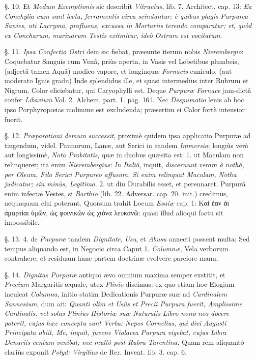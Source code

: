 \documentclass[a4paper, 11pt, oneside, polutonikogreek, german]{article}
\begin{document}
§. 10. Et \emph{Modum Exemptionis} sic describit \emph{Vitruvius}, lib. 7. Architect. cap. 13: \emph{Ea Conchylia cum sunt lecta, ferramentis circa scinduntur: è quibus plagis Purpurea Sanies, uti Lacryma, profluens, excussa in Mortariis terendo comparatur; et, quòd ex Concharum, marinarum Testis exitmitur, ideò Ostrum est vocitatum}.

§. 11. \emph{Ipsa Confectio Ostri} dein sic fiebat, præeunte iterum nobis \emph{Nierembergio}: Coquebatur Sanguis cum Venâ, priùs aperta, in Vasis vel Lebetibus plumbeis, (adjectâ tamen Aquâ) modico vapore, et longinquæ \emph{Fornacis} cuniculo, (aut moderato Ignis gradu) Inde splendidus ille, et quasi intermedius inter Rubrum et Nigrum, Color eliciebatur, qui Caryophylli est. Deque \emph{Purpuræ Fornace} jam-dictâ confer \emph{Libavium} Vol. 2. Alchem. part. 1. pag. 161. Nec \emph{Despumatio} lenis ab hoc ipso Porphyropœias molimine est excludenda; præsertim si Calor fortè intensior fuerit.

§. 12. \emph{Præparationi demum successit}, proximè quidem ipsa applicatio Purpuræ ad tingendum, videl. Pannorum, Lanæ, aut Serici in eandem \emph{Immersio}; longiùs verò aut longissimè, \emph{Nota Probitatis}, quæ in duobus quæsita est: 1. ut Maculam non relinqueret; ita enim \emph{Nierembergius}: \emph{In Italiâ}, inquit, \emph{discernunt veram à nothâ, per Oleum, Filo Serici Purpureo affusum. Si enim relinquat Maculam, Notha judicatur; sin minùs, Legitima}. 2. ut diu Durabilis esset, et perennaret. Purpurâ enim infectæ Vestes, si \emph{Barthio} (lib. 22. Adversar. cap. 20. init.) credimus, nequaquam elui poterant. Quorsum trahit Locum \emph{Esaiæ} cap. 1: Καὶ ἐαν ἁι ἀμαρτίαι ὑμῶν, ὡς φοινικῶν ὡς χιόνα λευκανῶ: quasi illud alioqui factu sit impossibile.

§. 13. 4. de \emph{Purpuræ} tandem \emph{Dignitate}, \emph{Usu}, et \emph{Abusu} annecti possent multa: Sed tempus aliquando est, in Negocio circa Caput 1. \emph{Columnæ}, Vela verborum contrahere, et residuam hanc partem doctrinæ evolvere parciore manu.

§. 14. \emph{Dignitas Purpuræ} antiquo ævo omnium maxima semper exstitit, et \emph{Precium} Margaritis æquale, utex \emph{Plinio} discimus: ex quo etiam hoc Elogium inculcat \emph{Columna}, initio statim Dedicationis Purpuræ suæ ad \emph{Cardinalem Sannesium}, dum ait: \emph{Quanti olim et Usûs et Precii Purpura fuerit, Amplissime Cardinalis, vel solus Plinius Historiæ suæ Naturalis Libro nono nos docere poterit, cujus hæc conceptu sunt Verba: Nepos Cornelius, qui divi Augusti Principatu obiit, Me, inquit, juvene Violacea Purpura vigebat, cujus Libra Denariis centum venibat; nec multò post Rubra Tarentina.} Quam rem aliquantò clariùs exponit \emph{Polyd: Virgilius} de Rer. Invent. lib. 3. cap. 6.
\end{document}
